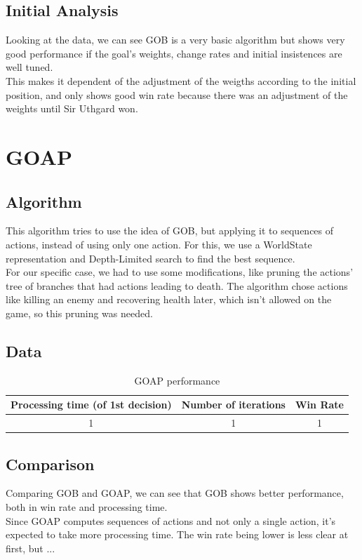 \documentclass{article}
\begin{document}
  \subsection{Initial Analysis}
  Looking at the data, we can see GOB is a very basic algorithm but shows very good performance if the goal's weights, change rates and initial insistences are well tuned.\\
  This makes it dependent of the adjustment of the weigths according to the initial position, and only shows good win rate because there was an adjustment of the weights
  until Sir Uthgard won. 
  \section{GOAP}
  \subsection{Algorithm}
  This algorithm tries to use the idea of GOB, but applying it to sequences of actions, instead of using only one action. For this, we use a WorldState representation 
  and Depth-Limited search to find the best sequence.\\
  For our specific case, we had to use some modifications, like pruning the actions' tree of branches that had actions leading to death. The algorithm chose actions like killing
  an enemy and recovering health later, which isn't allowed on the game, so this pruning was needed.
  \subsection{Data}
  \begin{table}[h!]
    \centering
    \caption{GOAP performance}
    \label{tab:tableGOAP1}
    \begin{tabular}{c|c|c}
      \textbf{Processing time (of 1st decision)} & \textbf{Number of iterations} & \textbf{Win Rate}\\
      \hline
      1 & 1 & 1
    \end{tabular}
  \end{table}
  \subsection{Comparison}
  Comparing GOB and GOAP, we can see that GOB shows better performance, both in win rate and processing time. \\
  Since GOAP computes sequences of actions and not only a single action, it's expected to take more processing time. The win rate being lower is less clear at first, but
  ...
  
\end{document}
